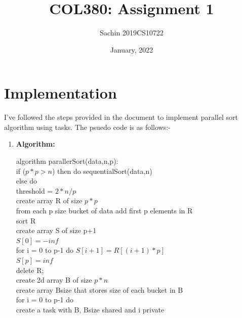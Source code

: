 \documentclass{article}
\title{COL380: Assignment 1}
\author{Sachin 2019CS10722 }
\date{January, 2022}
\begin{document}
\maketitle

\section{Implementation}
I've followed the steps provided in the document to implement parallel sort algorithm using tasks. 
The psuedo code is as follows:- 

\begin{enumerate}
    \item \textbf{Algorithm: }

algorithm parallerSort(data,n,p):\\
\hspace*{0.5cm}if ($p*p > n$) then do sequentialSort(data,n)\\
\hspace*{0.5cm}else do\\
\hspace*{1cm}threshold = $2*n/p$\\
\hspace*{1cm}create array R of size $p*p$\\
\hspace*{1cm}from each p size bucket of data add first p elements in R\\
\hspace*{1cm}sort R\\
\hspace*{1cm}create array S of size p+1\\
\hspace*{1cm}$S[0] = -inf$\\
\hspace*{1cm}for i = 0 to p-1 do $S[i+1] = R[(i+1)*p]$\\
\hspace*{1cm}$S[p] = inf$\\
\hspace*{1cm}delete R;\\
\hspace*{1cm}create 2d array B of size $p*n$\\
\hspace*{1cm}create array Bsize that stores size of each bucket in B\\
\hspace*{1cm}for i = 0 to p-1 do\\
\hspace*{1.5cm}create a task with B, Bsize shared and i private\\

\end{enumerate}
\end{document}
